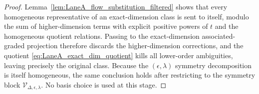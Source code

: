 \begin{proof}
Lemma~\ref{lem:LaneA_flow_substitution_filtered} shows that every homogeneous representative of an exact-dimension class is sent to itself,
modulo the sum of higher-dimension terms with explicit positive powers of $t$ and the homogeneous quotient relations.
Passing to the exact-dimension associated-graded projection therefore discards the higher-dimension corrections,
and the quotient \eqref{eq:LaneA_exact_dim_quotient} kills all lower-order ambiguities,
leaving precisely the original class.
Because the $(\epsilon,\lambda)$ symmetry decomposition is itself homogeneous, the same conclusion holds after restricting to the symmetry block
$\mathscr V_{\Delta,\epsilon,\lambda}$.
No basis choice is used at this stage.
\end{proof}

